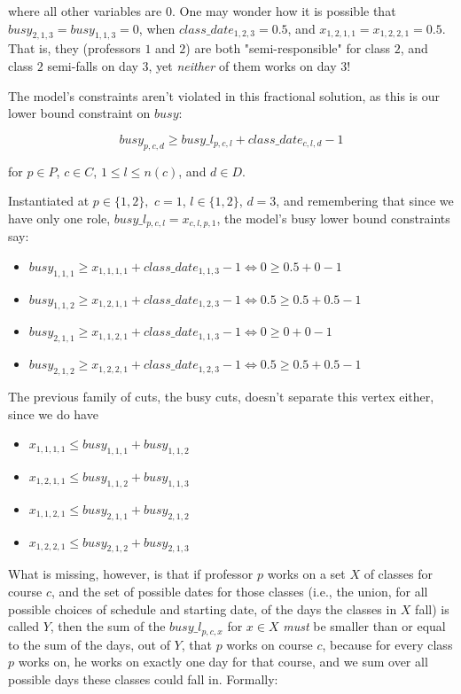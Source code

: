 \noindent where all other variables are $0$. One may wonder how it is possible that $busy_{2, 1, 3} = busy_{1, 1, 3} =  0$, when $class\_date_{1, 2, 3} = 0.5$, and $x_{1, 2, 1, 1} = x_{1, 2, 2, 1} = 0.5$. That is, they (professors $1$ and $2$) are both "semi-responsible" for class $2$, and class $2$ semi-falls on day $3$, yet \emph{neither} of them works on day $3$!

The model's constraints aren't violated in this fractional solution, as this is our lower bound constraint on $busy$:

$$
busy_{p, c, d} \ge busy\_l_{p, c, l} + class\_date_{c, l, d} - 1
$$

for $p \in P$, $c \in C$, $1 \le l \le n(c)$, and $d \in D$.

Instantiated at $p \in \{1, 2\},$ $c = 1$, $l \in \{1, 2\}$, $d = 3$, and remembering that since we have only one role, $busy\_l_{p, c, l} = x_{c, l, p, 1}$, the model's busy lower bound constraints say:

\begin{itemize}
\item $busy_{1, 1, 1} \ge x_{1, 1, 1, 1} + class\_date_{1, 1, 3} - 1 \iff 0 \ge 0.5 + 0 - 1$ \greencheck
\item $busy_{1, 1, 2} \ge x_{1, 2, 1, 1} + class\_date_{1, 2, 3} - 1 \iff 0.5 \ge 0.5 + 0.5 - 1$ \greencheck
\item $busy_{2, 1, 1} \ge x_{1, 1, 2, 1} + class\_date_{1, 1, 3} - 1 \iff 0 \ge 0 + 0 - 1$ \greencheck
\item $busy_{2, 1, 2} \ge x_{1, 2, 2, 1} + class\_date_{1, 2, 3} - 1 \iff 0.5 \ge 0.5 + 0.5 - 1$ \greencheck
\end{itemize}

The previous family of cuts, the busy cuts, doesn't separate this vertex either, since we do have 
\begin{itemize}
\item $x_{1, 1, 1, 1} \le busy_{1, 1, 1} + busy_{1, 1, 2}$ \greencheck
\item $x_{1, 2, 1, 1} \le busy_{1, 1, 2} + busy_{1, 1, 3}$ \greencheck
\item $x_{1, 1, 2, 1} \le busy_{2, 1, 1} + busy_{2, 1, 2}$ \greencheck
\item $x_{1, 2, 2, 1} \le busy_{2, 1, 2} + busy_{2, 1, 3}$ \greencheck
\end{itemize}

What is missing, however, is that if professor $p$ works on a set $X$ of classes for course $c$, and the set of possible dates for those classes (i.e., the union, for all possible choices of schedule and starting date, of the days the classes in $X$ fall) is called $Y$, then the sum of the $busy\_l_{p, c, x}$ for $x \in X$ \emph{must} be smaller than or equal to the sum of the days, out of $Y$, that $p$ works on course $c$, because for every class $p$ works on, he works on exactly one day for that course, and we sum over all possible days these classes could fall in. Formally:

